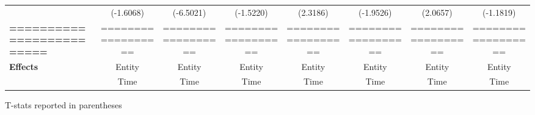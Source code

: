 \begin{center}
\begin{tabular}{lccccccc}
\textbf{ }                         &      (-1.6068)       &          (-6.5021)          &          (-1.5220)           &               (2.3186)              &            (-1.9526)             &           (2.0657)          &           (-1.1819)            \\
\textbf{=========================} &  ==================  &      ==================     &      ==================      &          ==================         &        ==================        &      ==================     &       ==================       \\
\textbf{Effects}                   &        Entity        &            Entity           &            Entity            &                Entity               &              Entity              &            Entity           &             Entity             \\
\textbf{}                          &         Time         &             Time            &             Time             &                 Time                &               Time               &             Time            &              Time              \\
\bottomrule
\end{tabular}
\end{center}

T-stats reported in parentheses
